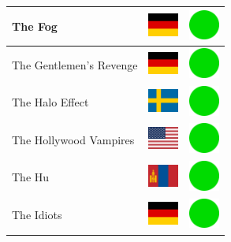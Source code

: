 \documentclass[12pt, a4paper, twoside]{report}
\begin{document}
\begin{center}
\begin{longtable}{|p{5cm}|p{2cm}|p{2cm}|}
 The Fog                                                    & \includegraphics[width=1cm]{../4x3/de} &   \includegraphics[width=1cm]{../likes/y} \\ \hline
 The Gentlemen's Revenge                                    & \includegraphics[width=1cm]{../4x3/de} &   \includegraphics[width=1cm]{../likes/y} \\ \hline
 The Halo Effect                                            & \includegraphics[width=1cm]{../4x3/se} &   \includegraphics[width=1cm]{../likes/y} \\ \hline
 The Hollywood Vampires                                     & \includegraphics[width=1cm]{../4x3/us} &   \includegraphics[width=1cm]{../likes/y} \\ \hline
 The Hu                                                     & \includegraphics[width=1cm]{../4x3/mn} &   \includegraphics[width=1cm]{../likes/y} \\ \hline
 The Idiots                                                 & \includegraphics[width=1cm]{../4x3/de} &   \includegraphics[width=1cm]{../likes/y} \\ \hline

\end{longtable}
\end{center}
\end{document}

